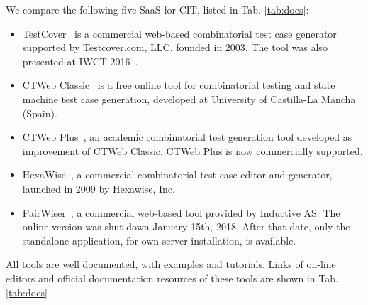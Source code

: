 \begin{tikzborder}{\cite{Gargantini16:validation}}
\begin{tikzborder}{\cite{gargantini_combinatorial_2017}}
\begin{tikzborder}{\cite{garn2019}}
\begin{tikzborder}{\cite{arcaini2019achieving}}
\begin{tikzborder}{}
We compare the following five SaaS for CIT, listed in Tab. \ref{tab:docs}:
\begin{itemize}
	\item TestCover~\cite{testcover} is a commercial web-based combinatorial test case generator supported by Testcover.com, LLC, founded in 2003. The tool was also presented at IWCT 2016~\cite{sherwood2016embedded}.
	\item CTWeb Classic~\cite{usaolaframework} is a free online tool for combinatorial testing and state machine test case generation,  developed at University of Castilla-La Mancha (Spain).
	\item CTWeb Plus~\cite{ctwebplus}, an academic combinatorial test generation tool developed as improvement of CTWeb Classic. CTWeb Plus is now commercially supported.
	\item HexaWise~\cite{hexawise}, a commercial combinatorial test case editor and generator, launched in 2009 by Hexawise, Inc.
	\item PairWiser~\cite{pairwiser}, a commercial web-based tool provided by Inductive AS. The online version was shut down January 15th, 2018. After that date, only the standalone application, for own-server installation, is available.
\end{itemize}

All tools are well documented, with examples and tutorials. Links of on-line editors and official documentation resources of these tools are shown in Tab. \ref{tab:docs}
\end{tikzborder}

\begin{table}[!hbt]
\end{table}
\end{tikzborder}
\end{tikzborder}
\end{tikzborder}
\end{tikzborder}
